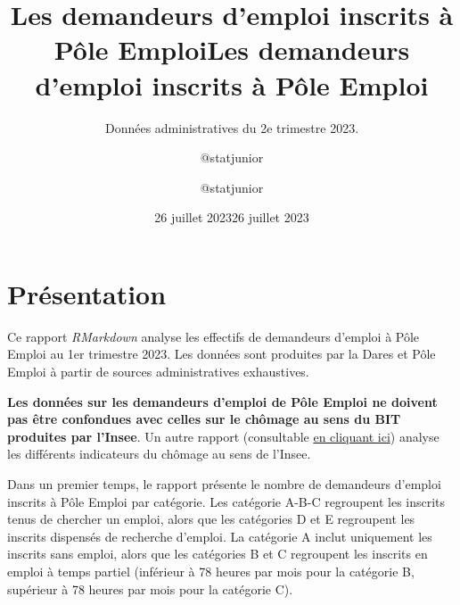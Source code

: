\documentclass[
  paper=a4,
  ,captions=tableheading
]{scrartcl}
\title{Les demandeurs d'emploi inscrits à Pôle Emploi}
\subtitle{Données administratives du 2e trimestre 2023.}
\author{@statjunior}
\date{26 juillet 2023}
\title{Les demandeurs d'emploi inscrits à Pôle Emploi}
\author{@statjunior}
\date{26 juillet 2023}
\begin{document}
\begin{titlepage}
\afterpage{\restorepagecolor}
\newcommand{\colorRule}[3][black]{\textcolor[HTML]{#1}{\rule{#2}{#3}}}
\end{titlepage}
\restoregeometry
{} 




\hypertarget{pruxe9sentation}{%
\section{Présentation}\label{pruxe9sentation}}

Ce rapport \emph{RMarkdown} analyse les effectifs de demandeurs d'emploi
à Pôle Emploi au 1er trimestre 2023. Les données sont produites par la
Dares et Pôle Emploi à partir de sources administratives exhaustives.

\textbf{Les données sur les demandeurs d'emploi de Pôle Emploi ne
doivent pas être confondues avec celles sur le chômage au sens du BIT
produites par l'Insee}. Un autre rapport (consultable
\href{https://github.com/statjunior/Statjunior/tree/main/March\%C3\%A9\%20du\%20travail\%20et\%20ch\%C3\%B4mage/Ch\%C3\%B4mage\%20BIT\%2C\%20halo\%20et\%20sous\%20emploi\%20-\%20Enqu\%C3\%AAte\%20Emploi/}{en
cliquant ici}) analyse les différents indicateurs du chômage au sens de
l'Insee.

Dans un premier temps, le rapport présente le nombre de demandeurs
d'emploi inscrits à Pôle Emploi par catégorie. Les catégorie A-B-C
regroupent les inscrits tenus de chercher un emploi, alors que les
catégories D et E regroupent les inscrits dispensés de recherche
d'emploi. La catégorie A inclut uniquement les inscrits sans emploi,
alors que les catégories B et C regroupent les inscrits en emploi à
temps partiel (inférieur à 78 heures par mois pour la catégorie B,
supérieur à 78 heures par mois pour la catégorie C).
\end{document}
